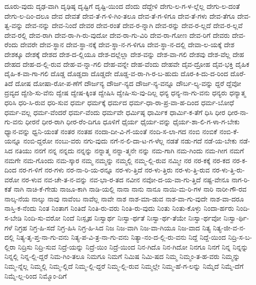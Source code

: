 {ದೂರು-ವುದು
ದೃಢ-ವಾಗಿ
ದೃಢಿಷ್ಠ
ದೃಷ್ಟಿಗೆ
ದೃಷ್ಟಿ-ಯಿಂದ
ದೆಂದು
ದೆದ್ದೇಳಿ
ದೇಗು-ಲ-ಗ-ಳ-ಲ್ಲೆಲ್ಲ
ದೇಗು-ಲ-ದಂತೆ
ದೇಗು-ಲ-ದಿಂ-ದಲೂ
ದೇವ
ದೇವತೆ
ದೇವ-ತೆ-ಗ-ಳಿ-ಗಿಂ-ತಲೂ
ದೇವ-ತೆ-ಗ-ಳಿಗೂ
ದೇವ-ತೆ-ಗಳು
ದೇವ-ತೆಗೂ
ದೇವ-ತ್ವ-ವನ್ನು
ದೇವ-ನನ್ನು
ದೇವ-ನಿಂದೆ
ದೇವರ
ದೇವ-ರಂತೆ
ದೇವ-ರ-ನ್ನಾಗಿ
ದೇವ-ರನ್ನು
ದೇವ-ರ-ಲ್ಲದೆ
ದೇವ-ರ-ಲ್ಲವೆ
ದೇವ-ರಲ್ಲಿ
ದೇವ-ರಾಗಿ
ದೇವ-ರಾ-ಗಿ-ರು-ವುದೋ
ದೇವ-ರಾ-ಗು-ವಿರಿ
ದೇವ-ರಾ-ಗೋಣ
ದೇವ-ರಿಗೆ
ದೇವರು
ದೇವ-ರೆಂದು
ದೇವರೇ
ದೇವ-ಸ್ಥಾನ
ದೇವ-ಸ್ಥಾ-ನಕ್ಕೆ
ದೇವ-ಸ್ಥಾ-ನ-ಗ-ಳಿಗೂ
ದೇವ-ಸ್ಥಾ-ನ-ದಲ್ಲಿ
ದೇವಾ-ಲ-ಯಕ್ಕೆ
ದೇಶ
ದೇಶಕ್ಕೂ
ದೇಶಕ್ಕೆ
ದೇಶದ
ದೇಶ-ದ-ಲ್ಲಿಯೂ
ದೇಶ-ದಲ್ಲೆಲ್ಲಾ
ದೇಶ-ವನ್ನು
ದೇಶ-ವಾ-ಗಲಿ
ದೇಶವು
ದೇಶ-ವೆಲ್ಲ
ದೇಹ
ದೇಹದ
ದೇಹ-ದ-ಲ್ಲಿ-ರುವ
ದೇಹ-ವ-ನ್ನಾ-ಗಲಿ
ದೇಹ-ವನ್ನೇ
ದೇಹ-ವೆಂದು
ದೇಹವೇ
ದೈವ-ದ್ರೋಹ
ದೈವ-ಭಕ್ತಿ
ದೈಹಿಕ
ದೈಹಿ-ಕ-ವಾ-ಗಾ-ಗಲಿ
ದೊಡ್ಡ
ದೊಡ್ಡದಾ
ದೊಡ್ಡದೇ
ದೊಡ್ಡ-ವ-ರಾ-ಗಿ-ರ-ಬ-ಹುದು
ದೊರ-ಕಿ-ದು-ದ-ರಿಂದ
ದೊರೆ-ತಿದೆ
ದೋಷ
ದೋಷಾ-ರೋ-ಪ-ಣೆಗೆ
ದೌರ್ಜನ್ಯ
ದೌರ್ಜ-ನ್ಯದ
ದೌರ್ಜ-ನ್ಯ-ವನ್ನೂ
ದೌರ್ಬ-ಲ್ಯ-ವನ್ನು
ದ್ದರೆ
ದ್ದೆವೋ
ದ್ರವ್ಯದ
ದ್ವೇಶಿ-ಸು-ವೆನು
ದ್ವೇಷ
ದ್ವೇಷ-ಕ್ಕಿಂತ
ದ್ವೇಷಿಸಿ
ದ್ವೇಷಿ-ಸು-ವು-ದಿಲ್ಲ
ಧನ್ಯ
ಧನ್ಯ-ನಾ-ಗು-ವನು
ಧನ್ಯರು
ಧನ್ಯಾತ್ಮ
ಧರಿಸಿ
ಧರಿ-ಸಿ-ರುವ
ಧರಿ-ಸುವ
ಧರ್ಮ
ಧರ್ಮಕ್ಕೆ
ಧರ್ಮದ
ಧರ್ಮ-ಧಾ-ರಾ-ಪ್ರ-ವಾ-ಹ-ದಿಂದ
ಧರ್ಮ-ಬೋಧೆ
ಧರ್ಮ-ವಲ್ಲ
ಧರ್ಮ-ವೆಂದರೆ
ಧರ್ಮ-ವೆಂದು
ಧರ್ಮವೇ
ಧರ್ಮಿಷ್ಠ
ಧಾರ್ಮಿಕ
ಧಾರ್ಮಿ-ಕ-ತೆಗೆ
ಧಿಸಿ
ಧೀರ
ಧೀರ-ನಾ-ಗು-ವನು
ಧೀರನೆ
ಧೀರ-ರಾಗಿ
ಧೀರ-ರೆಂ-ದಿಗೂ
ಧೂಳಿಗೆ
ಧೈರ್ಯ
ಧೈರ್ಯ-ವನ್ನು
ಧೈರ್ಯ-ಶಾ-ಲಿ-ಗ-ಳಾ-ಗ-ಬೇಕು
ಧ್ಯಾನ-ವನ್ನು
ಧ್ವನಿ-ಯಂತೆ
ನಂತರ
ನಂತಹ
ನಂದಾ-ದೀ-ವಿ-ಗೆ-ಯಂತೆ
ನಂದಿ-ಸ-ಲಾ-ಗದ
ನಂಬಿ
ನಂಬಿಕೆ
ನಂಬಿ-ಕೆ-ಯನ್ನೂ
ನಂಬಿ-ದ್ದರೋ
ನಂಬು-ವರು
ನಗು-ವುದು
ನಗೆ-ನ-ಲಿ-ದಾ-ಟ-ಗ-ಳೆಲ್ಲ
ನಡತೆ
ನಡು-ಗದೆ
ನಡೆ-ಯ-ಬೇಕು
ನಡೆ-ಸಿದ
ನತಿಯು
ನನಗೆ
ನನ್ನ
ನನ್ನದು
ನನ್ನನ್ನು
ನನ್ನಾತ್ಮ
ನನ್ನಾ-ತ್ಮನೇ
ನನ್ನು
ನಮ-ಗಾಗಿ
ನಮ-ಗಿಂದು
ನಮ-ಗೀಗ
ನಮಗೆ
ನಮಗೇ
ನಮ-ಗೊಂದು
ನಮ-ಸ್ಕಾರ
ನಮ್ಮ
ನಮ್ಮನ್ನು
ನಮ್ಮಲ್ಲಿ
ನಮ್ಮ-ಲ್ಲಿ-ರುವ
ನಮ್ಮೀ
ನರ
ನರ-ಕಕ್ಕೆ
ನರ-ಕದ
ನರ-ಕ-ದಿಂದ
ನರ-ಗ-ಳಿಗೆ
ನರ-ಗಳು
ನರ-ನಾ-ರಿ-ಯ-ರನ್ನೂ
ನರ-ಳು-ತ್ತಿದೆ
ನರ-ಳು-ತ್ತಿರು
ನರ-ಳು-ತ್ತಿ-ರುವ
ನರ-ಳು-ತ್ತಿ-ರು-ವರೋ
ನರ-ಳುವ
ನವ-ಚೇ-ತ-ನ-ವನ್ನು
ನವ-ಭಾ-ರ-ತದ
ನವೀನ
ನವೋ-ದ-ಯ-ವಾ-ಗು-ತ್ತಿದೆ
ನಷ್ಟ-ವೇನೂ
ನಾಗ-ರಿ-ಕತೆ
ನಾಗಿ
ನಾಚಿ-ಕೆ-ಗೇಡು
ನಾಜೂ-ಕಾಗಿ
ನಾಡಿ-ಯಲ್ಲಿ
ನಾನಾ
ನಾನು
ನಾನೂ
ನಾಯಿ-ಮ-ರಿ-ಗಳ
ನಾರಿ
ನಾರೀ-ಗೌ-ರವ
ನಾಲ್ಕ-ನೆಯ
ನಾಲ್ಕು
ನಾವು
ನಾವೆಂಬ
ನಾವೆಲ್ಲ
ನಾವೇ
ನಾಶ
ನಾಶ-ಮಾ-ಡುವ
ನಾಶ-ವಾ-ಗು-ವುದೇ
ನಾಶ-ವಾ-ದರೂ
ನಾಸ್ತಿ-ಕ-ನೆಂದು
ನಿಂತ
ನಿಂತಾಗ
ನಿಂತಿದೆ
ನಿಂತಿ-ರು-ವರು
ನಿಂತಿ-ರು-ವುದು
ನಿಂತು
ನಿಂತು-ಕೊಳ್ಳು
ನಿಂದಾ-ರ್ಹರು
ನಿಂದಿ-ಸ-ಬೇಡಿ
ನಿಂದಿ-ಸು-ವರೋ
ನಿಂದೆ
ನಿಃಸ್ಪೃಹ
ನಿಃಸ್ವಾರ್ಥ
ನಿಃಸ್ವಾ-ರ್ಥತೆ
ನಿಃಸ್ವಾ-ರ್ಥ-ತೆಯೇ
ನಿಃಸ್ವಾ-ರ್ಥವೋ
ನಿಃಸ್ವಾ-ರ್ಥಿ-ಗಳೆ
ನಿಗ್ರಹ
ನಿಗ್ರ-ಹಿ-ಸದೆ
ನಿಗ್ರ-ಹಿಸಿ
ನಿಗ್ರ-ಹಿ-ಸಿದ
ನಿಜ
ನಿಜ-ವಾಗಿ
ನಿಜ-ವಾ-ಗಿಯೂ
ನಿಜ-ವಾದ
ನಿತ್ಯ
ನಿತ್ಯ-ಜೀ-ವ-ನ-ದಲ್ಲಿ
ನಿತ್ಯ-ತೃ-ಪ್ತ-ನಾ-ಗು-ವನು
ನಿತ್ಯ-ಪ-ವಿ-ತ್ರ-ನಾ-ಗು-ವನು
ನಿತ್ಯಾ-ನಂ-ದ-ಲ್ಲಿ-ರು-ವನು
ನಿದ್ದೆ
ನಿದ್ದೆ-ಯಿಂದ
ನಿದ್ರಿ-ಸ-ಬ-ಲ್ಲಿರಾ
ನಿದ್ರಿಸು
ನಿದ್ರಿ-ಸುವ
ನಿದ್ರೆ-ಯನ್ನು
ನಿದ್ರೆ-ಯಿಂ
ನಿದ್ರೆ-ಯಿಂದ
ನಿನ-ಗಿದೊ
ನಿನ-ಗಿದೋ
ನಿನಗೂ
ನಿನಗೆ
ನಿನ್ನ
ನಿನ್ನನ್ನು
ನಿನ್ನಲ್ಲಿ
ನಿನ್ನ-ಲ್ಲಿ-ದ್ದರೆ
ನಿಮ-ಗಿಂ-ತಲೂ
ನಿಮಗೂ
ನಿಮಗೆ
ನಿಮಿಷ
ನಿಮಿ-ಷದ
ನಿಮ್ಮ
ನಿಮ್ಮಂ-ತ-ಹ-ವರು
ನಿಮ್ಮನ್ನು
ನಿಮ್ಮ-ನ್ನೆಲ್ಲ
ನಿಮ್ಮಲ್ಲಿ
ನಿಮ್ಮ-ಲ್ಲಿದೆ
ನಿಮ್ಮ-ಲ್ಲಿ-ದ್ದರೆ
ನಿಮ್ಮ-ಲ್ಲಿ-ರುವ
ನಿಮ್ಮಲ್ಲೇ
ನಿಮ್ಮ-ಹೆ-ಗ-ಲನ್ನು
ನಿಮ್ಮೆದೆ
ನಿಮ್ಮೆ-ದೆಗೆ
ನಿಮ್ಮೆ-ಲ್ಲ-ರಿಂದ
ನಿಮ್ಮೊಂ-ದಿಗೆ
}
